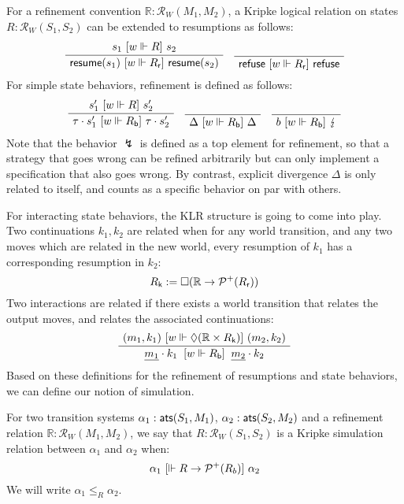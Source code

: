 For a refinement convention $\mathbb{R} : \mathcal{R}_W(M_1, M_2)$,
a Kripke logical relation on states $R : \mathcal{R}_W(S_1, S_2)$
can be extended to resumptions as follows:
\[
  \AxiomC{$s_1 \ifr{w \Vdash R} s_2$}
  \UnaryInfC{$\kw{resume}(s_1) \ifr{w \Vdash R_\kw{r}} \kw{resume}(s_2)$}
  \DisplayProof
  \quad
  \AxiomC{\rule{0pt}{\baselineskip}}
  \UnaryInfC{$\kw{refuse} \ifr{w \Vdash R_\kw{r}} \kw{refuse}$}
  \DisplayProof
\]
For simple state behaviors,
refinement is defined as follows:
\[
  \AxiomC{$s_1' \ifr{w \Vdash R} s_2'$}
  \UnaryInfC{$\tau \cdot s_1' \ifr{w \Vdash R_\kw{b}} \tau \cdot s_2'$}
  \DisplayProof
  \quad
  \AxiomC{\rule{0pt}{\baselineskip}}
  \UnaryInfC{$\Delta \ifr{w \Vdash R_\kw{b}} \Delta$}
  \DisplayProof
  \quad
  \AxiomC{\rule{0pt}{\baselineskip}}
  \UnaryInfC{$b \ifr{w \Vdash R_\kw{b}} \lightning$}
  \DisplayProof
\]
Note that the behavior $\lightning$ is defined as a top element
for refinement,
so that a strategy that goes wrong can be refined arbitrarily
but can only implement a specification that
also goes wrong.
By contrast,
explicit divergence $\Delta$
is only related to itself,
and counts as a specific behavior on par with others.

For interacting state behaviors,
the KLR structure is going to come into play.
Two continuations $k_1, k_2$ are related when
for any world transition,
and any two moves which are related in the new world,
every resumption of $k_1$ has a corresponding resumption in $k_2$:
\[
  R_{ \mathsf{k} } := \Box (\mathbb{R} \rightarrow \mathcal{P}^+(R_{ \mathsf{r} }))
\]
Two interactions are related
if there exists a world transition that relates the output moves,
and relates the associated continuations:
\[
  \AxiomC{$(m_1, k_1) \ifr{w \Vdash \Diamond (\mathbb{R} \times R_\kw{k})} (m_2, k_2)$}
  \UnaryInfC{$
	{\underline{m_1} \cdot k_1}
	\: \ifr{w \Vdash R_\kw{b}} \:
	{\underline{m_2} \cdot k_2}$}
  \DisplayProof
\]
Based on these definitions for the refinement of
resumptions and state behaviors,
we can define our notion of simulation.

\begin{definition}
For two transition systems
$\alpha_1 :  \mathsf{ats} (S_1, M_1)$,
$\alpha_2 :  \mathsf{ats} (S_2, M_2)$ and
a refinement relation
$\mathbb{R} : \mathcal{R}_W(M_1, M_2)$,
we say that
$R : \mathcal{R}_W(S_1, S_2)$
is a Kripke simulation relation between $\alpha_1$ and $\alpha_2$
when:
\[
    \alpha_1 \ [{\Vdash R \rightarrow \mathcal{P}^+(R_b)}]\  \alpha_2
\]
We will write $\alpha_1 \le_R \alpha_2$.
\end{definition}

